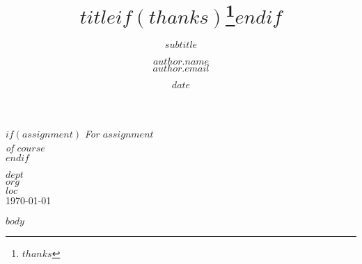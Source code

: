 \documentclass[12pt, letterpaper, twoside]{article}
\title{\vspace{3.0cm}$title$$if(thanks)$\thanks{$thanks$}$endif$}
\subtitle{$subtitle$}
\author{{$author.name$} \\[0.5cm]
{\normalsize $author.email$}}
\date{$date$}
\begin{document}
\setcounter{secnumdepth}{0}

\begin{titlepage}

\maketitle

\vfill
\vfill
\vfill
\vfill

\begin{center}

$if(assignment)$
\large \textit{For $assignment$}\\[0.3cm]
\large \textit{of $course$}\\
$endif$

\vfill

{\normalsize {$dept$} \\[0.2cm]
{$org$}\\[0.2cm]
$loc$}\\[1cm]

{\large \today}\\[2cm] %
 

\end{center}

\end{titlepage}

$body$

\newpage

\printbibliography
\end{document}
